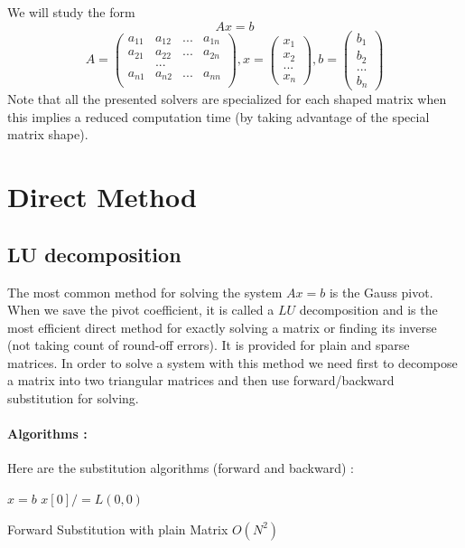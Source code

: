\documentclass[a4paper]{report}
\begin{document}
We will study the form
\[
Ax=b
\]
\[
A=\left( \begin{matrix}
a_{11}& a_{12} & ... & a_{1n}\\
a_{21}& a_{22} & ... & a_{2n}\\
&...&&\\
a_{n1}&a_{n2}&...&a_{nn}\\
\end{matrix} \right),
x=\left( \begin{matrix}
x_1\\
x_2\\
...\\
x_n
\end{matrix} \right),
b=\left(
\begin{matrix}
b_1\\
b_2\\
...\\
b_n
\end{matrix}
\right)
\]
Note that all the presented solvers are specialized for each shaped matrix when this implies a reduced computation time (by taking advantage of the special matrix shape).

\section{Direct Method}

\subsection{LU decomposition}
The most common method for solving the system $Ax=b$ is the Gauss pivot. When we save the pivot coefficient, it is called a $LU$ decomposition and is the most efficient direct method for exactly solving a matrix or finding its inverse (not taking count of round-off errors). It is provided for plain and sparse matrices. In order to solve a system with this method we need first to decompose a matrix into two triangular matrices and then use forward/backward substitution for solving.
\paragraph{Algorithms :}
Here are the substitution algorithms (forward and backward) : 
\\
\begin{algorithm}[H]
 $x=b$\;
 $x[0]/=L(0,0)$\;
 \caption{Forward Substitution with plain Matrix $O(N^2)$}
\end{algorithm}
\end{document}
